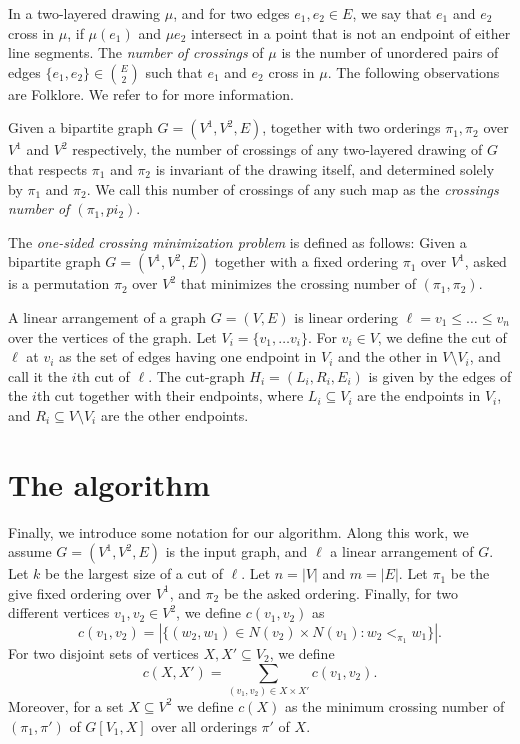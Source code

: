 \documentclass[a4paper,UKenglish,cleveref, autoref, thm-restate]{lipics-v2021}
\begin{document}
In a two-layered drawing $\mu$, and for two edges $e_1, e_2 \in E$, we say that $e_1$ and $e_2$ cross in $\mu$, if $\mu(e_1)$ and $\mu{e_2}$ intersect in a point that is not an endpoint of either line segments. The \emph{number of crossings} of $\mu$ is the number of unordered pairs of edges $\{e_1, e_2\}\in \binom{E}{2}$ such that $e_1$ and $e_2$ cross in $\mu$.
The following observations are Folklore. We refer to \cite{DBLP:journals/algorithmica/DujmovicW04} for more information.
\begin{lemma}
    Given a bipartite graph $G=(V^1,V^2, E)$, together with two orderings $\pi_1, \pi_2$ over $V^1$ and $V^2$ respectively, the number of crossings of any two-layered drawing  of $G$ that respects $\pi_1$ and $\pi_2$ is invariant of the drawing itself, and determined solely by $\pi_1$ and $\pi_2$.
    We call this number of crossings of any such map as the \emph{crossings number of $(\pi_1, pi_2)$}.
\end{lemma}

\begin{definition}
    The \emph{one-sided crossing minimization problem} is defined as follows: Given a bipartite graph $G = (V^1,V^2,E)$ together with a fixed ordering $\pi_1$ over $V^1$, asked is a permutation $\pi_2$ over $V^2$ that minimizes the crossing number of $(\pi_1, \pi_2)$.
\end{definition}

A linear arrangement of a graph $G=(V,E)$ is linear ordering $\ell = v_1\leq \dots \leq v_n$ over the vertices of the graph. Let $V_i = \{v_1,\dots v_i\}$. For $v_i \in V$, we define the cut of $\ell$ at $v_i$ as the set of edges having one endpoint in $V_i$ and the other in $V\setminus V_i$, and call it the $i$th cut of $\ell$. The cut-graph $H_i = (L_i,R_i, E_i)$ is given by the edges of the $i$th cut together with their endpoints, where $L_i\subseteq V_i$ are the endpoints in $V_i$, and $R_i \subseteq V\setminus V_i$ are the other endpoints.


\section{The algorithm}
Finally, we introduce some notation for our algorithm. Along this work, we assume $G=(V^1,V^2, E)$ is the input graph, and $\ell$ a linear arrangement of $G$. Let $k$ be the largest size of a cut of $\ell$. Let $n = |V|$ and $m=|E|$.
Let $\pi_1$ be the give fixed ordering over $V^1$, and $\pi_2$ be the asked ordering.
Finally, for two different vertices $v_1, v_2 \in V^2$, we define $c(v_1,v_2)$ as
\[c(v_1,v_2) = |\{(w_2, w_1)\in N(v_2)\times N(v_1)\colon w_2 <_{\pi_1} w_1\}|.\] 
For two disjoint sets of vertices $X,X'\subseteq V_2$, we define
\[c(X,X') = \sum\limits_{(v_1,v_2)\in X\times X'}c(v_1,v_2).\]
Moreover, for a set $X\subseteq V^2$ we define $c(X)$ as the minimum crossing number of $(\pi_1, \pi')$ of $G[V_1, X]$ over all orderings $\pi'$ of $X$.
\end{document}

